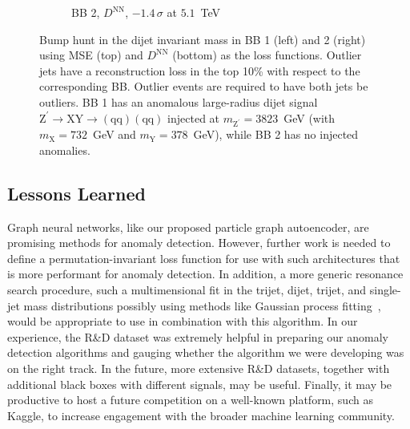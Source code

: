 \documentclass[letterpaper,11pt]{article}
\newcommand{\PZpr}{\ensuremath{\mathrm{Z}^{\prime}}\xspace} %
\newcommand{\PX}{\ensuremath{\mathrm{X}}\xspace} %
\newcommand{\PY}{\ensuremath{\mathrm{Y}}\xspace} %
\newcommand{\Pq}{\ensuremath{\mathrm{q}}\xspace} %
\begin{document}
\begin{figure}[htpb]
\begin{subfigure}[b]{0.45\textwidth}
        \caption*{BB 2, $D^\mathrm{NN}$, $-1.4\,\sigma$ at $5.1$~TeV}
    \end{subfigure}
\caption{Bump hunt in the dijet invariant mass in BB 1 (left) and 2 (right) using MSE (top) and $D^\mathrm{NN}$ (bottom) as the loss functions.
Outlier jets have a reconstruction loss in the top 10\% with respect to the corresponding BB. 
Outlier events are required to have both jets be outliers.
BB 1 has an anomalous large-radius dijet signal $\PZpr \to \PX\PY \to (\Pq\Pq)(\Pq\Pq)$ injected at $m_\PZpr=3823$~GeV (with $m_\PX = 732$~GeV and $m_\PY= 378$~GeV), while BB 2 has no injected anomalies.
}
\label{fig:gnnaebumps}
\end{figure}



\subsection{Lessons Learned}
\label{sec:lessons}

Graph neural networks, like our proposed particle graph autoencoder, are promising methods for anomaly detection.
However, further work is needed to define a permutation-invariant loss function for use with such architectures that is more performant for anomaly detection.
In addition, a more generic resonance search procedure, such a multimensional fit in the trijet, dijet, trijet, and single-jet mass distributions possibly using methods like Gaussian process fitting~\cite{Frate:2017mai}, would be appropriate to use in combination with this algorithm.
In our experience, the R\&D dataset was extremely helpful in preparing our anomaly detection algorithms and gauging whether the algorithm we were developing was on the right track. 
In the future, more extensive R\&D datasets, together with additional black boxes with different signals, may be useful.
Finally, it may be productive to host a future competition on a well-known platform, such as Kaggle, to increase engagement with the broader machine learning community.
\end{document}
